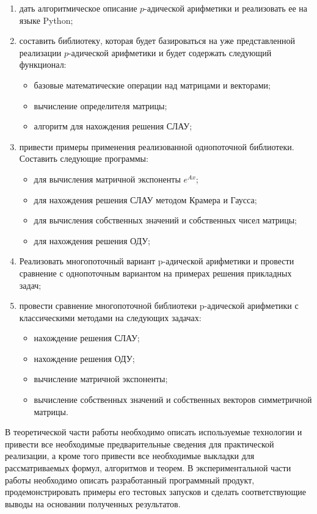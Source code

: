 \documentclass[master, och, times, assignment]{sty/SCWorks}
\begin{document}
\begin{enumerate}
	\item дать алгоритмическое описание $p$-адической арифметики и реализовать ее на языке Python;
	\item составить библиотеку, которая будет базироваться на уже представленной реализации $p$-адической арифметики и будет содержать следующий функционал:
	\begin{itemize}
    \item базовые математические операции над матрицами и векторами;
    \item вычисление определителя матрицы;
    \item алгоритм для нахождения решения СЛАУ;
    \end{itemize}
    \item привести примеры применения реализованной однопоточной библиотеки. Составить следующие программы:
	\begin{itemize}
    \item для вычисления матричной экспоненты $e^{Ax}$;
    \item для нахождения решения СЛАУ методом Крамера и Гаусса;
    \item для вычисления собственных значений и собственных чисел \mbox{матрицы};
    \item для нахождения решения ОДУ;
    \end{itemize}
    \item Реализовать многопоточный вариант p-адической арифметики и \mbox{провести} сравнение с однопоточным \mbox{вариантом} на примерах решения прикладных задач;
    \item провести сравнение многопоточной библиотеки p-адической \mbox{арифметики} с классическими методами на следующих задачах:
    \begin{itemize}
    \item нахождение решения СЛАУ;
    \item нахождение решения ОДУ;
 	\item вычисление матричной экспоненты;
 	\item вычисление собственных значений и собственных векторов симметричной матрицы.
    \end{itemize}
\end{enumerate}


В теоретической части работы необходимо описать используемые технологии и привести все необходимые предварительные сведения для \mbox{практической} реализации, а кроме того привести все необходимые \mbox{выкладки} для рассматриваемых формул, алгоритмов и теорем. В экспериментальной части работы необходимо описать разработанный программный продукт, продемонстрировать примеры его тестовых запусков и сделать соответствующие выводы на основании полученных результатов.

\signatureline
\end{document}

